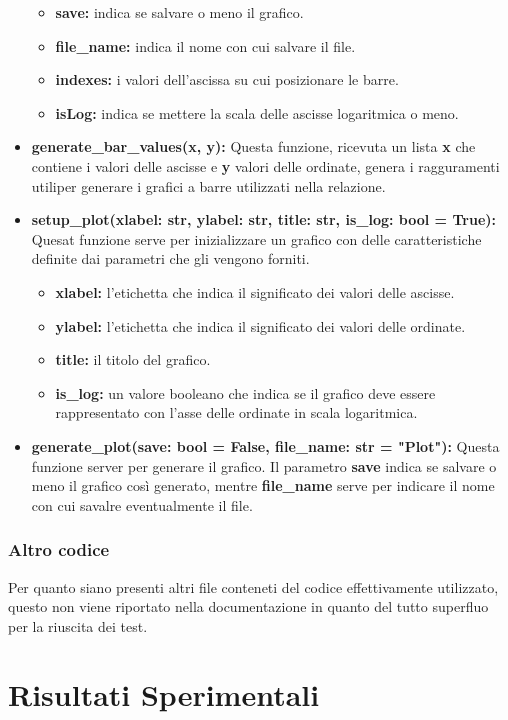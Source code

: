\documentclass{article}
\newcommand{\newlineitem}[1]{\item \textbf{#1} \hfill \break}
\begin{document}
\begin{itemize}
\begin{itemize}
\item \textbf{save:} indica se salvare o meno il grafico.
\item \textbf{file\_name:} indica il nome con cui salvare il file.
\item \textbf{indexes:} i valori dell'ascissa su cui posizionare le barre.
\item \textbf{isLog:} indica se mettere la scala delle ascisse logaritmica o meno.
\end{itemize}
\newlineitem{generate\_bar\_values(x, y):}
Questa funzione, ricevuta un lista \textbf{x} che contiene i valori delle ascisse e \textbf{y} valori delle ordinate, genera i ragguramenti utiliper generare i grafici a barre utilizzati nella relazione.
\newlineitem{setup\_plot(xlabel: str, ylabel: str, title: str, is\_log: bool = True):}
Quesat funzione serve per inizializzare un grafico con delle caratteristiche definite dai parametri che gli vengono forniti.
\begin{itemize}
\item \textbf{xlabel:} l'etichetta che indica il significato dei valori delle ascisse.
\item \textbf{ylabel:} l'etichetta che indica il significato dei valori delle ordinate.
\item \textbf{title:} il titolo del grafico.
\item \textbf{is\_log:} un valore booleano che indica se il grafico deve essere rappresentato con l'asse delle ordinate in scala logaritmica.
\end{itemize}

\newlineitem{generate\_plot(save: bool = False, file\_name: str = "Plot"):}
Questa funzione server per generare il grafico. Il parametro \textbf{save} indica se salvare o meno il grafico così generato, mentre \textbf{file\_name} serve per indicare il nome con cui savalre eventualmente il file.
\end{itemize}

\subsubsection{Altro codice}
Per quanto siano presenti altri file conteneti del codice effettivamente utilizzato, questo non viene riportato nella documentazione in quanto del tutto superfluo per la riuscita dei test.
\section{Risultati Sperimentali}
\end{document}
